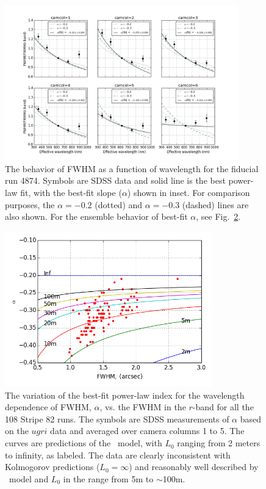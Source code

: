 \begin{figure}[th]
\centering
\includegraphics[width=0.9\textwidth]{FIGURES/fwhm_lambda.png}
\caption{The behavior of FWHM as a function of wavelength for the fiducial run 4874.
Symbols are SDSS data and solid line is the best power-law fit, with the best-fit slope
($\alpha$) shown in inset. For comparison purposes, the $\alpha=-0.2$ (dotted) and $\alpha=-0.3$ 
(dashed) lines are also shown. For the ensemble behavior of best-fit $\alpha$, see Fig.~\ref{fig:alpha_fwhm}. 
\label{fig:fwhm_lambda}}
\end{figure}


\begin{figure}[th]
\centering
\includegraphics[width=0.8\textwidth]{FIGURES/alpha_fwhm.png}
\caption{The variation of the best-fit power-law index for the wavelength dependence of FWHM, $\alpha$, 
vs. the FWHM in the $r$-band for all the 108 Stripe 82 runs. The symbols are SDSS
measurements of $\alpha$ based on the $ugri$ data and averaged over camera columns 1 to 5. 
The curves are predictions of the 
\vk~model, with $L_0$ ranging from 2 meters to infinity, as labeled. The data are clearly
inconsistent with Kolmogorov predictions ($L_0=\infty$) and reasonably well described by
\vk~model and $L_0$ in the range from 5m to $\sim$100m.  \label{fig:alpha_fwhm}}
\end{figure}

